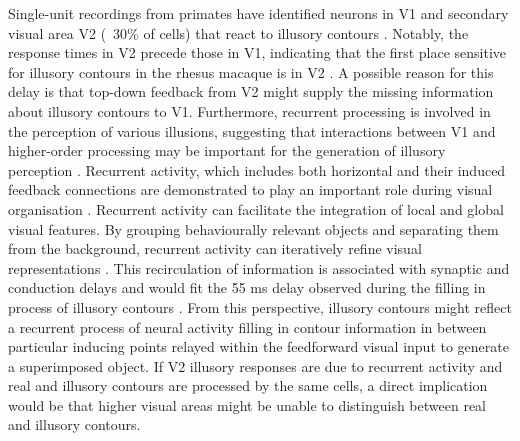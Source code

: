 \documentclass[12pt]{article}
\begin{document}
Single-unit recordings from primates have identified neurons in V1 and secondary visual area V2 (~30\% of cells) that react to illusory contours \autocite{vonderheydtMechanismsContourPerception1989}. Notably, the response times in V2 precede those in V1, indicating that the first place sensitive for illusory contours in the rhesus macaque is in V2 \autocite{leeDynamicsSubjectiveContour2001}. A possible reason for this delay is that top-down feedback from V2 might supply the missing information about illusory contours to V1. Furthermore, recurrent processing is involved in the perception of various illusions, suggesting that interactions between V1 and higher-order processing may be important for the generation of illusory perception \autocite{deweerdCuedependentDeficitsGrating1996,mendolaRepresentationIllusoryReal1999,panEquivalentRepresentationReal2012}. Recurrent activity, which includes both horizontal and their induced feedback connections are demonstrated to play an important role during visual organisation \autocite{roelfsemaCORTICALALGORITHMSPERCEPTUAL2006}. Recurrent activity can facilitate the integration of local and global visual features. By grouping behaviourally relevant objects and separating them from the background, recurrent activity can iteratively refine visual representations \autocite{roelfsemaCORTICALALGORITHMSPERCEPTUAL2006,shushruthStrongRecurrentNetworks2012}. This recirculation of information is associated with synaptic and conduction delays and would fit the 55 ms delay observed during the filling in process of illusory contours \autocite{leeDynamicsSubjectiveContour2001,pakTopDownFeedbackControls2020}. From this perspective, illusory contours might reflect a recurrent process of neural activity filling in contour information in between particular inducing points relayed within the feedforward visual input to generate a superimposed object. If V2 illusory responses are due to recurrent activity and real and illusory contours are processed by the same cells, a direct implication would be that higher visual areas might be unable to distinguish between real and illusory contours.
\bigbreak
\end{document}
